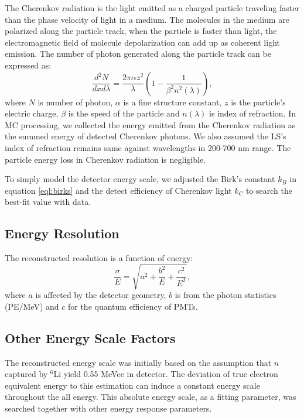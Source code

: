 The Cherenkov radiation is the light emitted as a charged particle traveling faster than the phase velocity of light in a medium. 
The molecules in the medium are polarized along the particle track, when the particle is faster than light, the electromagnetic field of molecule depolarization can add up as coherent light emission. 
The number of photon generated along the particle track can be expressed as:
\begin{equation}
    \frac{d^2N}{dxd\lambda} = \frac{2\pi\alpha z^2}{\lambda}\left(1- \frac{1}{\beta^2n^2(\lambda)}\right),
\end{equation}
where $N$ is number of photon, $\alpha$ is a fine structure constant, $z$ is the particle's electric charge, $\beta$ is the speed of the particle and $n(\lambda)$ is index of refraction.
In MC processing, we collected the energy emitted from the Cherenkov radiation as the summed energy of detected Cherenkov photons. 
We also assumed the LS's index of refraction remains same against wavelengths in 200-700 nm range.
The particle energy loss in Cherenkov radiation is negligible.

To simply model the detector energy scale, we adjusted the Birk's constant $k_B$ in equation \ref{eql:birks} and the detect efficiency of Cherenkov light $k_C$ to search the best-fit value with data.


\subsection{Energy Resolution}
The reconstructed resolution is a function of energy:
\begin{equation}
    \frac{\sigma}{E} = \sqrt{a^2 + \frac{b^2}{E}+\frac{c^2}{E^2}},
\end{equation}
where $a$ is affected by the detector geometry, $b$ is from the photon statistics (PE/MeV) and $c$ for the quantum efficiency of PMTs.

\subsection{Other Energy Scale Factors}
The reconstructed energy scale was initially based on the assumption that $n$ captured by $^6$Li yield 0.55 MeVee in detector. 
The deviation of true electron equivalent energy to this estimation can induce a constant energy scale throughout the all energy. 
This absolute energy scale, as a fitting parameter, was searched together with other energy response parameters.

